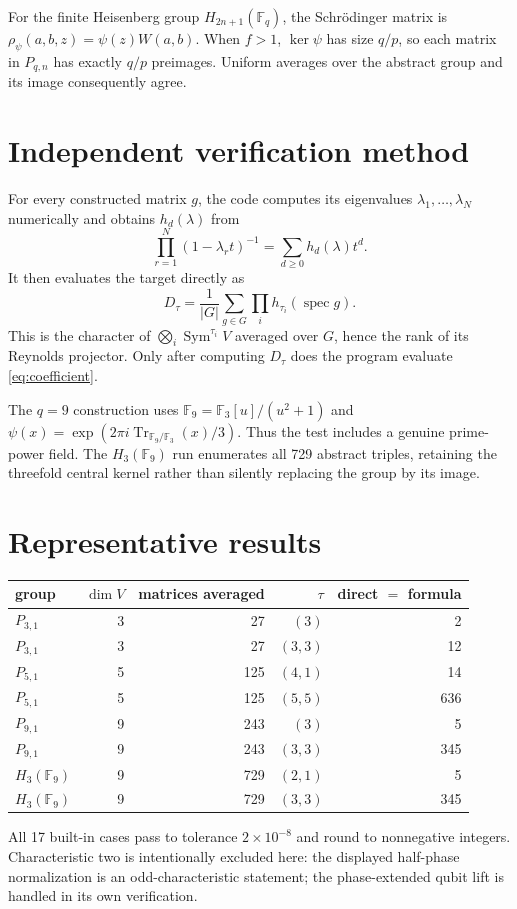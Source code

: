 \documentclass[11pt]{article}
\newcommand{\F}{\mathbb F}
\begin{document}
For the finite Heisenberg group $H_{2n+1}(\F_q)$, the Schrödinger matrix is
$\rho_\psi(a,b,z)=\psi(z)W(a,b)$.  When $f>1$, $\ker\psi$ has size $q/p$,
so each matrix in $P_{q,n}$ has exactly $q/p$ preimages.  Uniform averages
over the abstract group and its image consequently agree.

\section{Independent verification method}
For every constructed matrix $g$, the code computes its eigenvalues
$\lambda_1,\ldots,\lambda_N$ numerically and obtains $h_d(\lambda)$ from
\[
\prod_{r=1}^N(1-\lambda_r t)^{-1}=\sum_{d\ge0}h_d(\lambda)t^d.
\]
It then evaluates the target directly as
\[
D_\tau=\frac1{|G|}\sum_{g\in G}\prod_i h_{\tau_i}(\operatorname{spec}g).
\]
This is the character of $\bigotimes_i\operatorname{Sym}^{\tau_i}V$ averaged
over $G$, hence the rank of its Reynolds projector.  Only after computing
$D_\tau$ does the program evaluate \eqref{eq:coefficient}.

The $q=9$ construction uses $\F_9=\F_3[u]/(u^2+1)$ and
$\psi(x)=\exp(2\pi i\operatorname{Tr}_{\F_9/\F_3}(x)/3)$.  Thus the test
includes a genuine prime-power field.  The $H_3(\F_9)$ run enumerates all
729 abstract triples, retaining the threefold central kernel rather than
silently replacing the group by its image.

\section{Representative results}
\begin{center}
\begin{tabular}{@{}lrrrr@{}}\toprule
group & $\dim V$ & matrices averaged & $\tau$ & direct $=$ formula\\\midrule
$P_{3,1}$ &3&27&$(3)$&2\\
$P_{3,1}$ &3&27&$(3,3)$&12\\
$P_{5,1}$ &5&125&$(4,1)$&14\\
$P_{5,1}$ &5&125&$(5,5)$&636\\
$P_{9,1}$ &9&243&$(3)$&5\\
$P_{9,1}$ &9&243&$(3,3)$&345\\
$H_3(\F_9)$ &9&729&$(2,1)$&5\\
$H_3(\F_9)$ &9&729&$(3,3)$&345\\\bottomrule
\end{tabular}
\end{center}
All 17 built-in cases pass to tolerance $2\times10^{-8}$ and round to
nonnegative integers.  Characteristic two is intentionally excluded here:
the displayed half-phase normalization is an odd-characteristic statement;
the phase-extended qubit lift is handled in its own verification.
\end{document}
